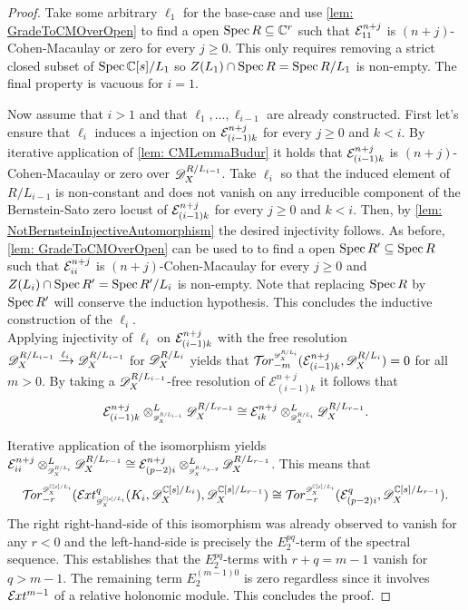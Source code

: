 \begin{proof}
  Take some arbitrary $\ell_1$ for the base-case and use \cref{lem: GradeToCMOverOpen} to find a open $\operatorname{Spec} R \subseteq \mathbb{C}^r$ such that $\mathcal{E}^{n+j}_{11}$  is $(n+j)$-Cohen-Macaulay or zero for every $j\geq 0$.
  This only requires removing a strict closed subset of $\operatorname{Spec} \mathbb{C}[s]/L_1$ so $Z(L_1)\cap \operatorname{Spec} R = \operatorname{Spec} R/L_1$ is non-empty.
  The final property is vacuous for $i=1$.

  Now assume that $i>1$ and that $\ell_1,\ldots, \ell_{i-1}$ are already constructed.
  First let's ensure that $\ell_i$
  induces a injection on $\mathcal{E}^{n+j}_{(i-1)k}$ for every $j\geq 0$ and $k<i$.
  By iterative application of \cref{lem: CMLemmaBudur} it holds that $\mathcal{E}^{n+j}_{(i-1)k }$
  is $(n+j)$-Cohen-Macaulay or zero over $\mathscr{D}_X^{R/L_{i-1}}$.
  Take $\ell_i$ so that the induced element of $R/L_{i-1}$ is non-constant and does not vanish on any irreducible component of the Bernstein-Sato zero locust of $\mathcal{E}^{n+j}_{(i-1)k}$ for every $j\geq 0$ and $k<i$.
  Then, by \cref{lem: NotBernsteinInjectiveAutomorphism} the desired injectivity follows.
  As before, \cref{lem: GradeToCMOverOpen} can be used to to find a open $\operatorname{Spec} R' \subseteq \operatorname{Spec} R$ such that $\mathcal{E}^{n+j}_{ii}$  is $(n+j)$-Cohen-Macaulay for every $j\geq 0$ and  $Z(L_i)\cap \operatorname{Spec} R' = \operatorname{Spec} R'/L_i$ is non-empty.
  Note that replacing $\operatorname{Spec} R$ by $\operatorname{Spec} R'$ will conserve the induction hypothesis.
  This concludes the inductive construction of the $\ell_i$.\\


  Applying injectivity of $\ell_i$ on $\mathcal{E}_{(i-1)k}^{n+j}$ with the free resolution $\mathscr{D}_X^{R/L_{i-1}}\xrightarrow{\ell_i}\mathscr{D}_X^{R/L_{i-1}}$ for $\mathscr{D}_X^{R/L_i}$ yields that $\Tr{\D_\X^{R/L_i}}{-m}(\E_{(i-1)k}^{n+j}, \D_\X^{R/L_i}) = 0$ for all $m>0$.
  By taking a $\mathscr{D}_X^{R/L_{i-1}}$-free resolution of $\mathcal{E}_{(i-1)k}^{n+j}$ it follows that
  $$\mathcal{E}_{(i-1)k}^{n+j} \otimes^L_{\scaleto{\D_\X^{R/L_{i-1}}}{8pt}} \D_\X^{R/L_{r-1}} \cong  \mathcal{E}_{ik}^{n+j}  \otimes^L_{\scaleto{\D_\X^{R/L_{i}}}{8pt}}\D_\X^{R/L_{r-1}}. $$


  Iterative application of the isomorphism yields $\E_{ii}^{n+j}\otimes^L_{\scaleto{\D_\X^{R/L_{i}}}{8pt}} \D_\X^{R/L_{r-1}} \cong \E_{(p-2)i}^{n+j}\otimes^L_{\scaleto{\D_\X^{R/L_{p-2}}}{8pt}} \D_\X^{R/L_{r-1}}$.
  This means that
  $$\Tr{\D_\X^{\C[s]/L_{i}}}{-r} (\Ex{\D_\X^{\C[s]/L_{i}} }{q} (K_i,\D_\X^{\C[s]/L_{i}}), \D_\X^{\C[s]/L_{r-1}})\cong \Tr{\D_\X^{\C[s]/L_{i}} }{-r}(\E_{(p-2)i}^{q}, \D_\X^{\C[s]/L_{r-1}}).$$
  The right right-hand-side of this isomorphism was already observed to vanish for any $r < 0$ and the left-hand-side is precisely the $E^{pq}_2$-term of the spectral sequence.
  This establishes that the $E^{pq}_2$-terms with $r+q = m -1$ vanish for $q>m-1$.
  The remaining term $E^{(m -1)0}_2$ is zero regardless since it involves $\mathcal{E}\mkern -1mu xt^{m - 1}$ of a relative holonomic module.
  This concludes the proof.
\end{proof}
